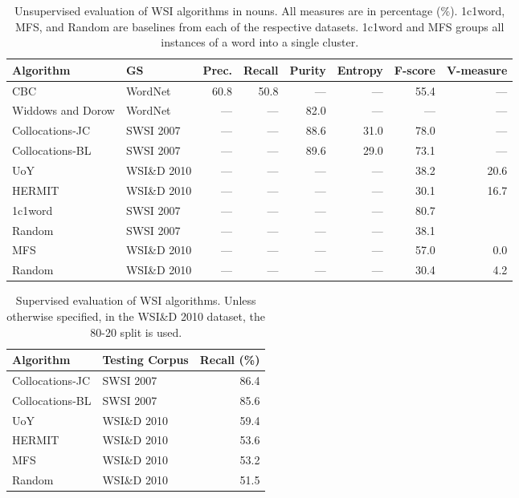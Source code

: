 \begin{table}
\caption[Unsupervised evaluation of \acl*{WSI} algorithms]
{Unsupervised evaluation of \ac{WSI} algorithms in nouns. All measures are in
percentage ($\%$). 1c1word, \ac{MFS}, and Random are baselines from each of the
respective datasets. 1c1word and \ac{MFS} groups all instances of a word into a
single cluster.}
\label{tab:uswsi}

\begin{tabu} to \textwidth { Xlrrrrrr }
\hline
\textbf{Algorithm} & \textbf{GS} & \textbf{Prec.} & \textbf{Recall} & \textbf{Purity} & \textbf{Entropy} & \textbf{F-score} & \textbf{V-measure} \\
\hline
CBC               & WordNet        & 60.8 & 50.8 & ---  & ---  & 55.4 & ---  \\
Widdows and Dorow & WordNet        & ---  & ---  & 82.0 & ---  & ---  & ---  \\
Collocations-JC   & \ac{SWSI} 2007 & ---  & ---  & 88.6 & 31.0 & 78.0 & ---  \\
Collocations-BL   & \ac{SWSI} 2007 & ---  & ---  & 89.6 & 29.0 & 73.1 & ---  \\
UoY     & WSI\&D 2010    & ---  & ---  & ---  & ---  & 38.2 & 20.6 \\
HERMIT  & WSI\&D 2010    & ---  & ---  & ---  & ---  & 30.1 & 16.7 \\
\hline
1c1word & \ac{SWSI} 2007 & ---  & ---  & ---  & ---  & 80.7 &  \\
Random  & \ac{SWSI} 2007 & ---  & ---  & ---  & ---  & 38.1 &  \\
MFS     & WSI\&D 2010    & ---  & ---  & ---  & ---  & 57.0 & 0.0  \\
Random  & WSI\&D 2010    & ---  & ---  & ---  & ---  & 30.4 & 4.2  \\
\hline
\end{tabu}
\end{table}


\begin{table}
\caption[Supervised evaluation of \acl*{WSI} algorithms]
{Supervised evaluation of \ac{WSI} algorithms. Unless otherwise specified, in
the WSI\&D 2010 dataset, the 80-20 split is used.}
\label{tab:wsi}

\begin{tabu} to \textwidth { XXr }
\hline
\textbf{Algorithm} & \textbf{Testing Corpus} & \textbf{Recall} (\%)\\
\hline
Collocations-JC           & \ac{SWSI} 2007 & 86.4 \\
Collocations-BL           & \ac{SWSI} 2007 & 85.6 \\
UoY            & WSI\&D 2010    & 59.4 \\
HERMIT           & WSI\&D 2010    & 53.6 \\
\hline
MFS           & WSI\&D 2010    & 53.2 \\
Random        & WSI\&D 2010    & 51.5 \\
\hline
\end{tabu}
\end{table}

